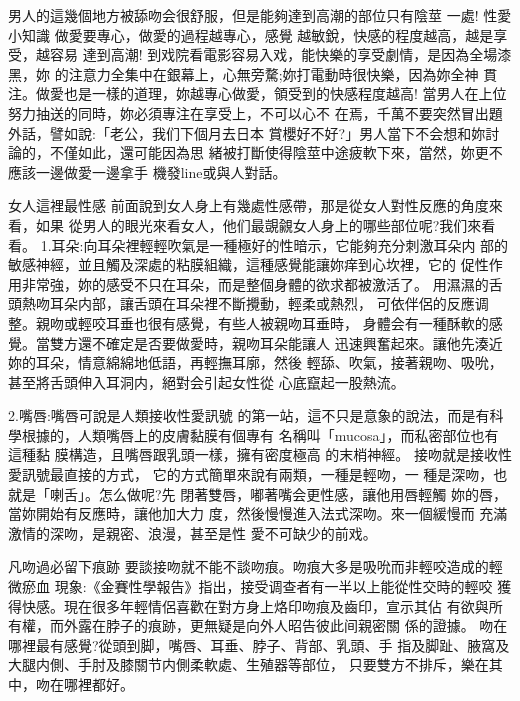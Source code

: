 \documentclass[12pt,UTF8]{ctexbook}
\begin{document}
男人的這幾個地方被舔吻会很舒服，但是能夠達到高潮的部位只有陰莖
一處!
性愛小知識
做愛要專心，做愛的過程越專心，感覺
越敏銳，快感的程度越高，越是享受，越容易
達到高潮!
到戏院看電影容易入戏，能快樂的享受劇情，是因為全場漆黑，妳
的注意力全集中在銀幕上，心無旁騖;妳打電動時很快樂，因為妳全神
貫注。做愛也是一樣的道理，妳越專心做愛，領受到的快感程度越高!
當男人在上位努力抽送的同時，妳必須專注在享受上，不可以心不
在焉，千萬不要突然冒出題外話，譬如說:「老公，我们下個月去日本
賞櫻好不好?」男人當下不会想和妳討論的，不僅如此，還可能因為思
緒被打斷使得陰莖中途疲軟下來，當然，妳更不應該一邊做愛一邊拿手
機發line或與人對話。

女人這裡最性感
前面說到女人身上有幾處性感帶，那是從女人對性反應的角度來看，如果
從男人的眼光來看女人，他们最覬覦女人身上的哪些部位呢?我们來看看。
1.耳朵:向耳朵裡輕輕吹氣是一種極好的性暗示，它能夠充分刺激耳朵内
部的敏感神經，並且觸及深處的粘膜組織，這種感覺能讓妳痒到心坎裡，它的
促性作用非常強，妳的感受不只在耳朵，而是整個身體的欲求都被激活了。
用濕濕的舌頭熱吻耳朵内部，讓舌頭在耳朵裡不斷攪動，輕柔或熱烈，
可依伴侶的反應调整。親吻或輕咬耳垂也很有感覺，有些人被親吻耳垂時，
身體会有一種酥軟的感覺。當雙方還不確定是否要做愛時，親吻耳朵能讓人
迅速興奮起來。讓他先湊近妳的耳朵，情意綿綿地低語，再輕撫耳廓，然後
輕舔、吹氣，接著親吻、吸吮，甚至將舌頭伸入耳洞内，絕對会引起女性從
心底竄起一股熱流。

2.嘴唇:嘴唇可說是人類接收性愛訊號
的第一站，這不只是意象的說法，而是有科
學根據的，人類嘴唇上的皮膚黏膜有個專有
名稱叫「mucosa」，而私密部位也有這種黏
膜構造，且嘴唇跟乳頭一樣，擁有密度極高
的末梢神經。
接吻就是接收性愛訊號最直接的方式，
它的方式簡單來說有兩類，一種是輕吻，一
種是深吻，也就是「喇舌」。怎么做呢?先
閉著雙唇，嘟著嘴会更性感，讓他用唇輕觸
妳的唇，當妳開始有反應時，讓他加大力
度，然後慢慢進入法式深吻。來一個緩慢而
充滿激情的深吻，是親密、浪漫，甚至是性
愛不可缺少的前戏。

凡吻過必留下痕跡
要談接吻就不能不談吻痕。吻痕大多是吸吮而非輕咬造成的輕微瘀血
現象:《金賽性學報告》指出，接受调查者有一半以上能從性交時的輕咬
獲得快感。現在很多年輕情侶喜歡在對方身上烙印吻痕及齒印，宣示其佔
有欲與所有權，而外露在脖子的痕跡，更無疑是向外人昭告彼此间親密關
係的證據。
吻在哪裡最有感覺?從頭到脚，嘴唇、耳垂、脖子、背部、乳頭、手
指及脚趾、腋窩及大腿内側、手肘及膝關节内側柔軟處、生殖器等部位，
只要雙方不排斥，樂在其中，吻在哪裡都好。
\end{document}
